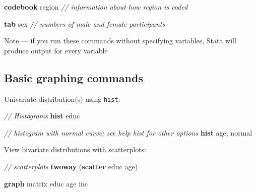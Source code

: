 \documentclass[
]{book}
\newenvironment{Shaded}{\begin{snugshade}}{\end{snugshade}}
\newcommand{\CommentTok}[1]{\textcolor[rgb]{0.56,0.35,0.01}{\textit{#1}}}
\newcommand{\FunctionTok}[1]{\textcolor[rgb]{0.00,0.00,0.00}{#1}}
\newcommand{\KeywordTok}[1]{\textcolor[rgb]{0.13,0.29,0.53}{\textbf{#1}}}
\newcommand{\NormalTok}[1]{#1}
\begin{document}
\begin{Shaded}
\begin{Highlighting}[]
\KeywordTok{codebook}\NormalTok{ region }\CommentTok{// information about how region is coded}
\end{Highlighting}
\end{Shaded}

\begin{Shaded}
\begin{Highlighting}[]
\KeywordTok{tab}\NormalTok{ sex }\CommentTok{// numbers of male and female participants}
\end{Highlighting}
\end{Shaded}

Note --- if you run these commands without specifying variables, Stata will produce output for every variable

\hypertarget{basic-graphing-commands}{%
\subsection{Basic graphing commands}\label{basic-graphing-commands}}

Univariate distribution(s) using \texttt{hist}:

\begin{Shaded}
\begin{Highlighting}[]
\CommentTok{// Histograms }
\KeywordTok{hist}\NormalTok{ educ}
\end{Highlighting}
\end{Shaded}

\begin{Shaded}
\begin{Highlighting}[]
\CommentTok{// histogram with normal curve; see \textasciigrave{}help hist\textasciigrave{} for other options}
\KeywordTok{hist}\NormalTok{ age, }\FunctionTok{normal}  
\end{Highlighting}
\end{Shaded}

View bivariate distributions with scatterplots:

\begin{Shaded}
\begin{Highlighting}[]
\CommentTok{// scatterplots }
\KeywordTok{twoway}\NormalTok{ (}\KeywordTok{scatter}\NormalTok{ educ age)}
\end{Highlighting}
\end{Shaded}

\begin{Shaded}
\begin{Highlighting}[]
\KeywordTok{graph} \FunctionTok{matrix}\NormalTok{ educ age inc}
\end{Highlighting}
\end{Shaded}
\end{document}
